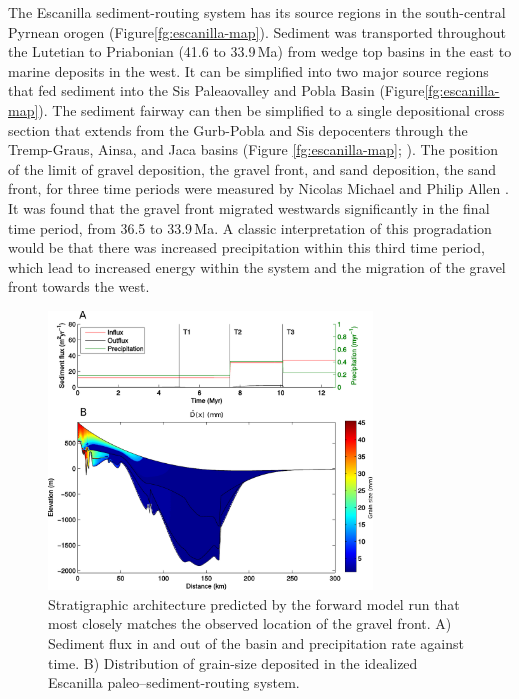 The Escanilla sediment-routing system has its source regions in the south-central Pyrnean orogen (Figure\ref{fg:escanilla-map}). Sediment was transported throughout the Lutetian to Priabonian (41.6 to 33.9\,Ma) from wedge top basins in the east to marine deposits in the west. It can be simplified into two major source regions that fed sediment into the Sis Paleaovalley and Pobla Basin (Figure\ref{fg:escanilla-map}). The sediment fairway can then be simplified to a single depositional cross section that extends from the Gurb-Pobla and Sis depocenters through the Tremp-Graus, Ainsa, and Jaca basins (Figure \ref{fg:escanilla-map}; \citep{michael-etal-2013}). The position of the limit of gravel deposition, the gravel front, and sand deposition, the sand front, for three time periods were measured by Nicolas Michael and Philip Allen \citep{michael-etal-2013}. It was found that the gravel front migrated westwards significantly in the final time period, from 36.5 to 33.9\,Ma. A classic interpretation of this progradation would be that there was increased precipitation within this third time period, which lead to increased energy within the system and the migration of the gravel front towards the west.

\begin{figure}
\centering
\includegraphics[width=8.6cm]{./figures/ch2-escanilla-model.pdf}
\caption{Stratigraphic architecture predicted by the forward model run that most closely matches the observed location of the gravel front. A) Sediment flux in and out of the basin and precipitation rate against time. B) Distribution of grain-size deposited in the idealized Escanilla paleo--sediment-routing system.}
\label{fg:escanilla-model}
\end{figure}

